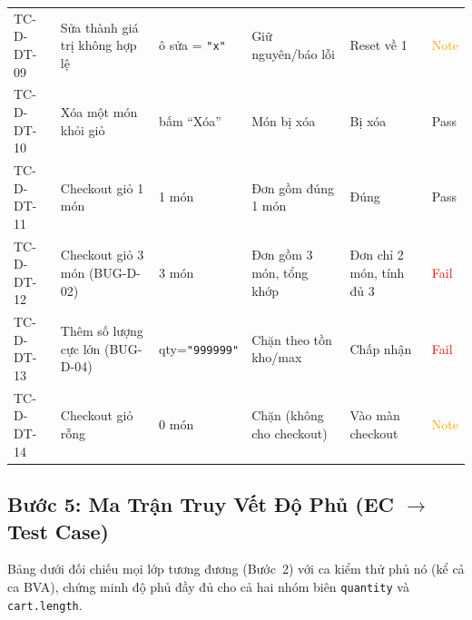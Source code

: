 \documentclass[12pt, a4paper]{report}
\begin{document}
\begin{longtable}{C{1.2cm} L{3.2cm} L{3.1cm} L{3cm} C{1.9cm} C{1.4cm}}
    TC-D-DT-09 & Sửa thành giá trị không hợp lệ & ô sửa = \texttt{"x"} & Giữ nguyên/báo lỗi & Reset về 1 & \textcolor{orange}{Note} \\
    TC-D-DT-10 & Xóa một món khỏi giỏ & bấm ``Xóa'' & Món bị xóa & Bị xóa & \textcolor{green!60!black}{Pass} \\
    TC-D-DT-11 & Checkout giỏ 1 món & 1 món & Đơn gồm đúng 1 món & Đúng & \textcolor{green!60!black}{Pass} \\
    TC-D-DT-12 & Checkout giỏ 3 món \newline (BUG-D-02) & 3 món & Đơn gồm 3 món, tổng khớp & Đơn chỉ 2 món, tính đủ 3 & \textcolor{red}{Fail} \\
    TC-D-DT-13 & Thêm số lượng cực lớn \newline (BUG-D-04) & qty=\texttt{"999999"} & Chặn theo tồn kho/max & Chấp nhận & \textcolor{red}{Fail} \\
    TC-D-DT-14 & Checkout giỏ rỗng & 0 món & Chặn (không cho checkout) & Vào màn checkout & \textcolor{orange}{Note} \\
\end{longtable}

\subsection{Bước 5: Ma Trận Truy Vết Độ Phủ (EC $\to$ Test Case)}
Bảng dưới đối chiếu mọi lớp tương đương (Bước~2) với ca kiểm thử phủ nó (kể cả ca BVA), chứng
minh độ phủ đầy đủ cho cả hai nhóm biên \texttt{quantity} và \texttt{cart.length}.
\end{document}
